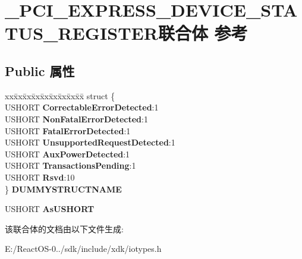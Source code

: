 \hypertarget{union___p_c_i___e_x_p_r_e_s_s___d_e_v_i_c_e___s_t_a_t_u_s___r_e_g_i_s_t_e_r}{}\section{\+\_\+\+P\+C\+I\+\_\+\+E\+X\+P\+R\+E\+S\+S\+\_\+\+D\+E\+V\+I\+C\+E\+\_\+\+S\+T\+A\+T\+U\+S\+\_\+\+R\+E\+G\+I\+S\+T\+E\+R联合体 参考}
\label{union___p_c_i___e_x_p_r_e_s_s___d_e_v_i_c_e___s_t_a_t_u_s___r_e_g_i_s_t_e_r}
\subsection*{Public 属性}
\begin{DoxyCompactItemize}
\item 
\mbox{\label{union___p_c_i___e_x_p_r_e_s_s___d_e_v_i_c_e___s_t_a_t_u_s___r_e_g_i_s_t_e_r_a086282572f3907ef85d1388b26389334}} 
\begin{tabbing}
xx\=xx\=xx\=xx\=xx\=xx\=xx\=xx\=xx\=\kill
struct \{\\
\>USHORT {\bfseries CorrectableErrorDetected}:1\\
\>USHORT {\bfseries NonFatalErrorDetected}:1\\
\>USHORT {\bfseries FatalErrorDetected}:1\\
\>USHORT {\bfseries UnsupportedRequestDetected}:1\\
\>USHORT {\bfseries AuxPowerDetected}:1\\
\>USHORT {\bfseries TransactionsPending}:1\\
\>USHORT {\bfseries Rsvd}:10\\
\} {\bfseries DUMMYSTRUCTNAME}\\

\end{tabbing}\item 
\mbox{\label{union___p_c_i___e_x_p_r_e_s_s___d_e_v_i_c_e___s_t_a_t_u_s___r_e_g_i_s_t_e_r_abef89eb6f8309abb311cbc622c659fda}} 
U\+S\+H\+O\+RT {\bfseries As\+U\+S\+H\+O\+RT}
\end{DoxyCompactItemize}


该联合体的文档由以下文件生成\+:\begin{DoxyCompactItemize}
\item 
E\+:/\+React\+O\+S-\/0../sdk/include/xdk/iotypes.\+h\end{DoxyCompactItemize}

